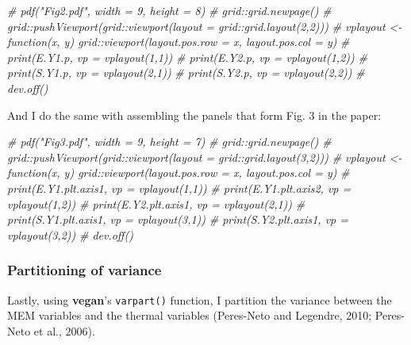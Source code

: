 \documentclass[10pt,A4,]{article}
\newenvironment{Shaded}{\begin{snugshade}}{\end{snugshade}}
\newcommand{\CommentTok}[1]{\textcolor[rgb]{0.56,0.35,0.01}{\textit{#1}}}
\begin{document}
\begin{Shaded}
\begin{Highlighting}[]
\CommentTok{# pdf("Fig2.pdf", width = 9, height = 8)}
\CommentTok{# grid::grid.newpage()}
\CommentTok{# grid::pushViewport(grid::viewport(layout = grid::grid.layout(2,2)))}
\CommentTok{# vplayout <- function(x, y) grid::viewport(layout.pos.row = x, layout.pos.col = y)}
\CommentTok{# print(E.Y1.p, vp = vplayout(1,1))}
\CommentTok{# print(E.Y2.p, vp = vplayout(1,2))}
\CommentTok{# print(S.Y1.p, vp = vplayout(2,1))}
\CommentTok{# print(S.Y2.p, vp = vplayout(2,2))}
\CommentTok{# dev.off()}
\end{Highlighting}
\end{Shaded}

And I do the same with assembling the panels that form Fig. 3 in the
paper:

\begin{Shaded}
\begin{Highlighting}[]
\CommentTok{# pdf("Fig3.pdf", width = 9, height = 7)}
\CommentTok{# grid::grid.newpage()}
\CommentTok{# grid::pushViewport(grid::viewport(layout = grid::grid.layout(3,2)))}
\CommentTok{# vplayout <- function(x, y) grid::viewport(layout.pos.row = x, layout.pos.col = y)}
\CommentTok{# print(E.Y1.plt.axis1, vp = vplayout(1,1))}
\CommentTok{# print(E.Y1.plt.axis2, vp = vplayout(1,2))}
\CommentTok{# print(E.Y2.plt.axis1, vp = vplayout(2,1))}
\CommentTok{# print(S.Y1.plt.axis1, vp = vplayout(3,1))}
\CommentTok{# print(S.Y2.plt.axis1, vp = vplayout(3,2))}
\CommentTok{# dev.off()}
\end{Highlighting}
\end{Shaded}

\subsubsection*{Partitioning of variance}

Lastly, using \textbf{vegan}'s \texttt{varpart()} function, I partition
the variance between the MEM variables and the thermal variables
(Peres-Neto and Legendre, 2010; Peres-Neto et al., 2006).
\end{document}
